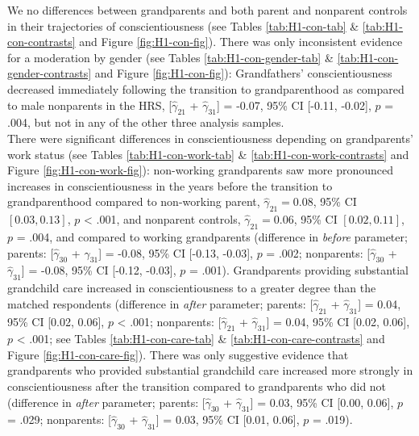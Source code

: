 \documentclass[
  english,
  man, noextraspace,floatsintext]{apa7}
\begin{document}
We no differences between grandparents and both parent and nonparent controls in their trajectories of conscientiousness (see Tables \ref{tab:H1-con-tab} \& \ref{tab:H1-con-contrasts} and Figure \ref{fig:H1-con-fig}). There was only inconsistent evidence for a moderation by gender (see Tables \ref{tab:H1-con-gender-tab} \& \ref{tab:H1-con-gender-contrasts} and Figure \ref{fig:H1-con-fig}): Grandfathers' conscientiousness decreased immediately following the transition to grandparenthood as compared to male nonparents in the HRS, {[}\(\hat{\gamma}_{21}\) + \(\hat{\gamma}_{31}\){]} = -0.07, 95\% CI {[}-0.11, -0.02{]}, \(p\) = .004, but not in any of the other three analysis samples.\\
There were significant differences in conscientiousness depending on grandparents' work status (see Tables \ref{tab:H1-con-work-tab} \& \ref{tab:H1-con-work-contrasts} and Figure \ref{fig:H1-con-work-fig}): non-working grandparents saw more pronounced increases in conscientiousness in the years before the transition to grandparenthood compared to non-working parent, \(\hat{\gamma}_{21} = 0.08\), 95\% CI \([0.03, 0.13]\), \(p\) \textless{} .001, and nonparent controls, \(\hat{\gamma}_{21} = 0.06\), 95\% CI \([0.02, 0.11]\), \(p\) = .004, and compared to working grandparents (difference in \emph{before} parameter; parents: {[}\(\hat{\gamma}_{30}\) + \(\hat{\gamma}_{31}\){]} = -0.08, 95\% CI {[}-0.13, -0.03{]}, \(p\) = .002; nonparents: {[}\(\hat{\gamma}_{30}\) + \(\hat{\gamma}_{31}\){]} = -0.08, 95\% CI {[}-0.12, -0.03{]}, \(p\) = .001). Grandparents providing substantial grandchild care increased in conscientiousness to a greater degree than the matched respondents (difference in \emph{after} parameter; parents: {[}\(\hat{\gamma}_{21}\) + \(\hat{\gamma}_{31}\){]} = 0.04, 95\% CI {[}0.02, 0.06{]}, \(p\) \textless{} .001; nonparents: {[}\(\hat{\gamma}_{21}\) + \(\hat{\gamma}_{31}\){]} = 0.04, 95\% CI {[}0.02, 0.06{]}, \(p\) \textless{} .001; see Tables \ref{tab:H1-con-care-tab} \& \ref{tab:H1-con-care-contrasts} and Figure \ref{fig:H1-con-care-fig}). There was only suggestive evidence that grandparents who provided substantial grandchild care increased more strongly in conscientiousness after the transition compared to grandparents who did not (difference in \emph{after} parameter; parents: {[}\(\hat{\gamma}_{30}\) + \(\hat{\gamma}_{31}\){]} = 0.03, 95\% CI {[}0.00, 0.06{]}, \(p\) = .029; nonparents: {[}\(\hat{\gamma}_{30}\) + \(\hat{\gamma}_{31}\){]} = 0.03, 95\% CI {[}0.01, 0.06{]}, \(p\) = .019).
\end{document}
